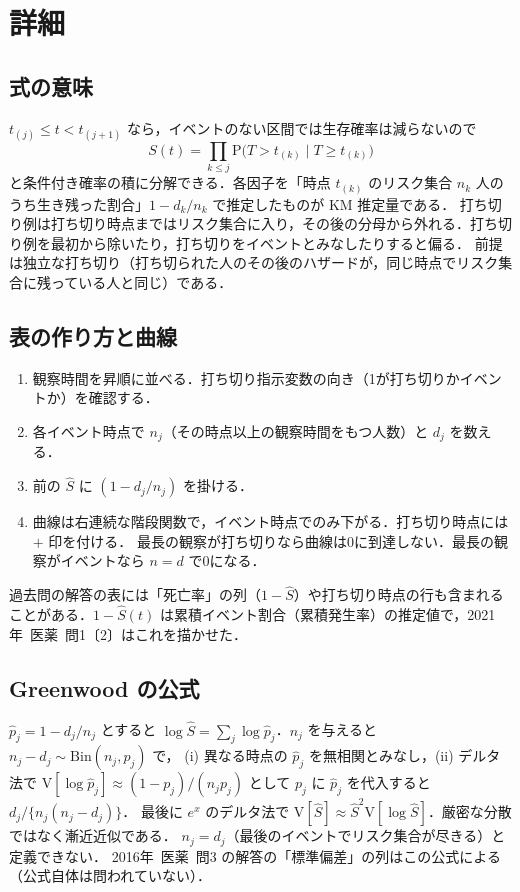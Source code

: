 \documentclass[a4paper,11pt,openany]{ltjsbook}
\newcommand{\kakomon}[2]{\mbox{#1年 医薬 問#2}}
\newcommand{\V}{\mathrm{V}}
\newcommand{\Prob}{\mathrm{P}}
\newcommand{\Bin}{\mathrm{Bin}}
\begin{document}
\section{詳細}\label{sec:m04-shosai}
\subsection{式の意味}
$t_{(j)}\le t<t_{(j+1)}$ なら，イベントのない区間では生存確率は減らないので
\[
S(t)=\prod_{k\le j}\Prob\bigl(T>t_{(k)}\mid T\ge t_{(k)}\bigr)
\]
と条件付き確率の積に分解できる．各因子を「時点 $t_{(k)}$ のリスク集合 $n_k$ 人のうち生き残った割合」$1-d_k/n_k$ で推定したものが KM 推定量である．
打ち切り例は打ち切り時点まではリスク集合に入り，その後の分母から外れる．打ち切り例を最初から除いたり，打ち切りをイベントとみなしたりすると偏る．
前提は独立な打ち切り（打ち切られた人のその後のハザードが，同じ時点でリスク集合に残っている人と同じ）である．

\subsection{表の作り方と曲線}
\begin{enumerate}
\item 観察時間を昇順に並べる．打ち切り指示変数の向き（1が打ち切りかイベントか）を確認する．
\item 各イベント時点で $n_j$（その時点以上の観察時間をもつ人数）と $d_j$ を数える．
\item 前の $\hat S$ に $(1-d_j/n_j)$ を掛ける．
\item 曲線は右連続な階段関数で，イベント時点でのみ下がる．打ち切り時点には $+$ 印を付ける．
      最長の観察が打ち切りなら曲線は0に到達しない．最長の観察がイベントなら $n=d$ で0になる．
\end{enumerate}
過去問の解答の表には「死亡率」の列（$1-\hat S$）や打ち切り時点の行も含まれることがある．$1-\hat S(t)$ は累積イベント割合（累積発生率）の推定値で，\kakomon{2021}{1}〔2〕はこれを描かせた．

\subsection{Greenwood の公式}
$\hat p_j=1-d_j/n_j$ とすると $\log\hat S=\sum_j\log\hat p_j$．$n_j$ を与えると $n_j-d_j\sim\Bin(n_j,p_j)$ で，
(i) 異なる時点の $\hat p_j$ を無相関とみなし，(ii) デルタ法で $\V[\log\hat p_j]\approx(1-p_j)/(n_jp_j)$ として $p_j$ に $\hat p_j$ を代入すると $d_j/\{n_j(n_j-d_j)\}$．
最後に $e^x$ のデルタ法で $\V[\hat S]\approx\hat S^2\V[\log\hat S]$．厳密な分散ではなく漸近近似である．
$n_j=d_j$（最後のイベントでリスク集合が尽きる）と定義できない．
\kakomon{2016}{3} の解答の「標準偏差」の列はこの公式による（公式自体は問われていない）．
\end{document}
